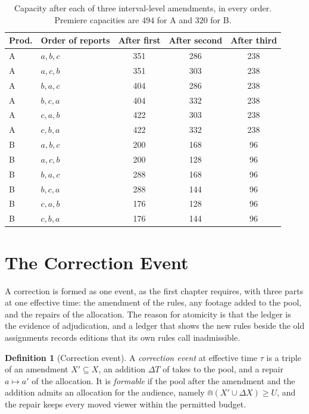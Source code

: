 \documentclass[11pt,twoside,openright]{book}
\theoremstyle{plain}
\theoremstyle{definition}
\newtheorem{definition}[theorem]{Definition}
\theoremstyle{remark}
\begin{document}
\begin{table}[ht]
\centering
\begin{tabular}{@{}llccc@{}}
\toprule
Prod. & Order of reports & After first & After second & After third\\
\midrule
A & $a, b, c$ & 351 & 286 & 238\\
A & $a, c, b$ & 351 & 303 & 238\\
A & $b, a, c$ & 404 & 286 & 238\\
A & $b, c, a$ & 404 & 332 & 238\\
A & $c, a, b$ & 422 & 303 & 238\\
A & $c, b, a$ & 422 & 332 & 238\\
B & $a, b, c$ & 200 & 168 & 96\\
B & $a, c, b$ & 200 & 128 & 96\\
B & $b, a, c$ & 288 & 168 & 96\\
B & $b, c, a$ & 288 & 144 & 96\\
B & $c, a, b$ & 176 & 128 & 96\\
B & $c, b, a$ & 176 & 144 & 96\\
\bottomrule
\end{tabular}
\caption{Capacity after each of three interval-level amendments, in every order. Premiere capacities are $494$ for A and $320$ for B.}\label{tab:paths}
\end{table}

\section{The Correction Event}\label{sec:event}

A correction is formed as one event, as the first chapter requires, with three parts at one effective time: the amendment of the rules, any footage added to the pool, and the repairs of the allocation. The reason for atomicity is that the ledger is the evidence of adjudication, and a ledger that shows the new rules beside the old assignments records editions that its own rules call inadmissible.

\begin{definition}[Correction event]\label{def:event}
A \emph{correction event} at effective time $\tau$ is a triple of an amendment $X'\subseteq X$, an addition $\Delta T$ of takes to the pool, and a repair $a\mapsto a'$ of the allocation. It is \emph{formable} if the pool after the amendment and the addition admits an allocation for the audience, namely $\Cap(X'\cup\Delta X)\ge U$, and the repair keeps every moved viewer within the permitted budget.
\end{definition}
\end{document}
